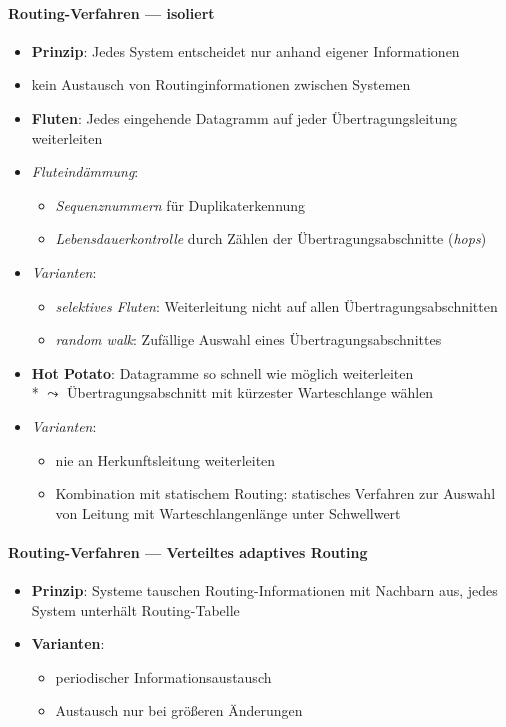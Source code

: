 \paragraph{Routing-Verfahren --- isoliert}
\begin{itemize}
  \item \textbf{Prinzip}: Jedes System entscheidet nur anhand eigener Informationen
  \item kein Austausch von Routinginformationen zwischen Systemen
  \item \textbf{Fluten}: Jedes eingehende Datagramm auf jeder Übertragungsleitung weiterleiten
  \item \emph{Fluteindämmung}:
  \begin{itemize}
    \item \emph{Sequenznummern} für Duplikaterkennung
    \item \emph{Lebensdauerkontrolle} durch Zählen der Übertragungsabschnitte (\emph{hops})
  \end{itemize}
  \item \emph{Varianten}:
  \begin{itemize}
    \item \emph{selektives Fluten}: Weiterleitung nicht auf allen Übertragungsabschnitten
    \item \emph{random walk}: Zufällige Auswahl eines Übertragungsabschnittes
  \end{itemize}
  \item \textbf{Hot Potato}: Datagramme so schnell wie möglich weiterleiten \\*
    \( \leadsto \) Übertragungsabschnitt mit kürzester Warteschlange wählen
  \item \emph{Varianten}:
  \begin{itemize}
    \item nie an Herkunftsleitung weiterleiten
    \item Kombination mit statischem Routing: statisches Verfahren zur Auswahl von Leitung mit Warteschlangenlänge unter Schwellwert
  \end{itemize}
\end{itemize}

\paragraph{Routing-Verfahren --- Verteiltes adaptives Routing}
\begin{itemize}
  \item \textbf{Prinzip}: Systeme tauschen Routing-Informationen mit Nachbarn aus, jedes System unterhält Routing-Tabelle
  \item \textbf{Varianten}:
  \begin{itemize}
    \item periodischer Informationsaustausch
    \item Austausch nur bei größeren Änderungen
  \end{itemize}
\end{itemize}

